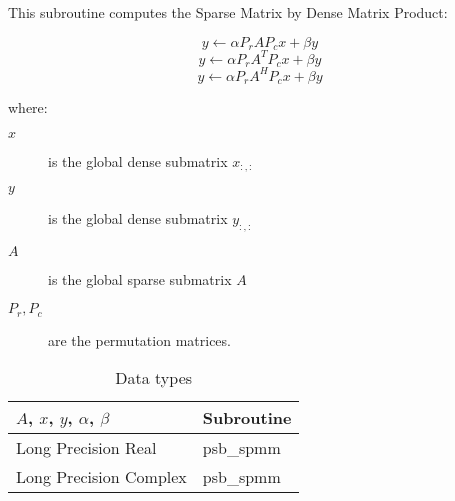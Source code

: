 
This subroutine computes the Sparse Matrix by Dense Matrix Product:

\begin{equation}
y \leftarrow \alpha P_r A P_c x + \beta y
\label{eq:f90spmm_no_tra}
\end{equation}
\begin{equation}
y \leftarrow \alpha P_r A^T P_c x + \beta y
\label{eq:f90spmm_tra}
\end{equation}
\begin{equation}
y \leftarrow \alpha P_r A^H P_c x + \beta y
\label{eq:f90spmm_con}
\end{equation}

where:
\begin{description}
\item[$x$] is the global dense submatrix $x_{:, :}$
\item[$y$] is the global dense submatrix $y_{:, :}$
\item[$A$] is the global sparse submatrix $A$
\item[$P_r, P_c$] are the permutation matrices.
\end{description}

\begin{table}[h]
\begin{center}
\begin{tabular}{ll}
\hline
$A$, $x$, $y$, $\alpha$, $\beta$ & {\bf Subroutine}\\
\hline
Long Precision Real & psb\_spmm \\
Long Precision Complex & psb\_spmm \\
\hline
\end{tabular}
\end{center}
\caption{Data types\label{tab:f90spmm}}
\end{table}


